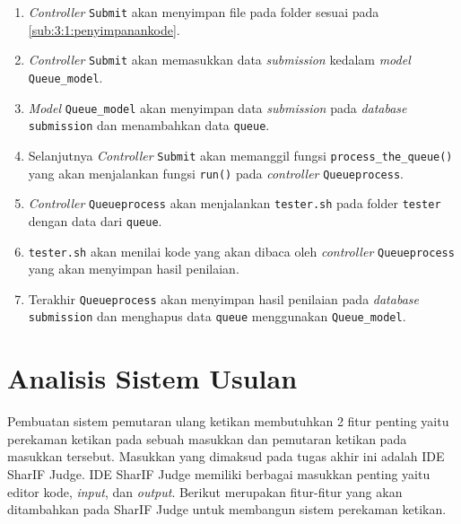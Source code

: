 \begin{enumerate}
	\item \textit{Controller} \verb|Submit| akan menyimpan file pada folder sesuai pada \ref{sub:3:1:penyimpanankode}.
	\item \textit{Controller} \verb|Submit| akan memasukkan data \textit{submission} kedalam \textit{model} \verb|Queue_model|.
	\item \textit{Model} \verb|Queue_model| akan menyimpan data \textit{submission} pada \textit{database} \verb|submission| dan menambahkan data \verb|queue|.
	\item Selanjutnya \textit{Controller} \verb|Submit| akan memanggil fungsi \verb|process_the_queue()| yang akan menjalankan fungsi \verb|run()| pada \textit{controller} \verb|Queueprocess|.
	\item \textit{Controller} \verb|Queueprocess| akan menjalankan \verb|tester.sh| pada folder \verb|tester| dengan data dari \verb|queue|.
	\item \verb|tester.sh| akan menilai kode yang akan dibaca oleh \textit{controller} \verb|Queueprocess| yang akan menyimpan hasil penilaian.
	\item Terakhir \verb|Queueprocess| akan menyimpan hasil penilaian pada \textit{database} \verb|submission| dan menghapus data \verb|queue| menggunakan \verb|Queue_model|.
\end{enumerate}


\section{Analisis Sistem Usulan}
\label{sec:3:sistemusulan}

Pembuatan sistem pemutaran ulang ketikan membutuhkan 2 fitur penting yaitu perekaman ketikan pada sebuah masukkan dan pemutaran ketikan pada masukkan tersebut. Masukkan yang dimaksud pada tugas akhir ini adalah IDE SharIF Judge. IDE SharIF Judge memiliki berbagai masukkan penting yaitu editor kode, \textit{input}, dan \textit{output}. Berikut merupakan fitur-fitur yang akan ditambahkan pada SharIF Judge untuk membangun sistem perekaman ketikan.


